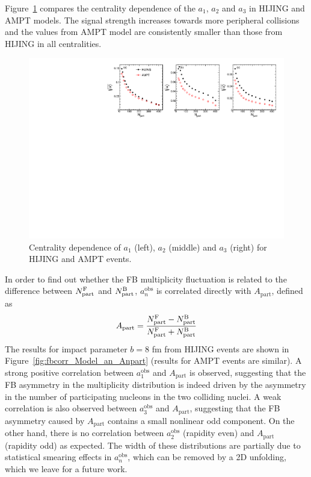 Figure~\ref{fig:fbcorr_Model_an} compares the centrality dependence of the $a_1$, $a_2$ and $a_3$ in HIJING and AMPT models. The signal strength increases towards more peripheral collisions and the values from AMPT model are consistently smaller than those from HIJING in all centralities.

\begin{figure}[H]
\centering
\includegraphics[width=.95\linewidth]{figs/chapter_fbcorr/Model_an.pdf}
\caption{Centrality dependence of $a_1$ (left), $a_2$ (middle) and $a_3$ (right) for HIJING and AMPT events.}
\label{fig:fbcorr_Model_an}
\end{figure}

In order to find out whether the FB multiplicity fluctuation is related to the difference between $N_\text{part}^\text{F}$ and $N_\text{part}^\text{B}$, $a_n^\text{obs}$ is correlated directly with $A_\text{part}$, defined as
\begin{equation}
A_\text{part} = \frac{N_\text{part}^\text{F} - N_\text{part}^\text{B}}{N_\text{part}^\text{F} + N_\text{part}^\text{B}}
\end{equation}
The results for impact parameter $b=8$ fm from HIJING events are shown in Figure~\ref{fig:fbcorr_Model_an_Anpart} (results for AMPT events are similar). A strong positive correlation between $a_1^\text{obs}$ and $A_\text{part}$ is observed, suggesting that the FB asymmetry in the multiplicity distribution is indeed driven by the asymmetry in the number of participating nucleons in the two colliding nuclei. A weak correlation is also observed between $a_3^\text{obs}$ and $A_\text{part}$, suggesting that the FB asymmetry caused by $A_\text{part}$ contains a small nonlinear odd component. On the other hand, there is no correlation between $a_2^\text{obs}$ (rapidity even) and $A_\text{part}$ (rapidity odd) as expected. The width of these distributions are partially due to statistical smearing effects in $a_n^\text{obs}$, which can be removed by a 2D unfolding, which we leave for a future work.

